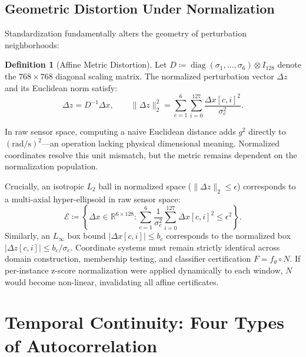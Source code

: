 \documentclass[11pt,a4paper]{article}
\newcommand{\R}{\mathbb R}
\theoremstyle{definition}
\newtheorem{definition}[proposition]{Definition}
\begin{document}
\subsection{Geometric Distortion Under Normalization}
Standardization fundamentally alters the geometry of perturbation neighborhoods:
\begin{definition}[Affine Metric Distortion]
Let $D \coloneqq \operatorname{diag}(\sigma_1, \ldots, \sigma_6) \otimes I_{128}$ denote the $768 \times 768$ diagonal scaling matrix. The normalized perturbation vector $\Delta z$ and its Euclidean norm satisfy:
\begin{equation}
\Delta z = D^{-1} \Delta x, \qquad \|\Delta z\|_2^2 = \sum_{c=1}^6 \sum_{i=0}^{127} \frac{\Delta x[c, i]^2}{\sigma_c^2}.
\end{equation}
\end{definition}

In raw sensor space, computing a naive Euclidean distance adds $g^2$ directly to $(\mathrm{rad/s})^2$---an operation lacking physical dimensional meaning. Normalized coordinates resolve this unit mismatch, but the metric remains dependent on the normalization population.

Crucially, an isotropic $L_2$ ball in normalized space ($\|\Delta z\|_2 \le \epsilon$) corresponds to a multi-axial hyper-ellipsoid in raw sensor space:
\begin{equation}
\mathcal{E} \coloneqq \left\{ \Delta x \in \R^{6 \times 128} : \sum_{c=1}^6 \frac{1}{\sigma_c^2} \sum_{i=0}^{127} \Delta x[c, i]^2 \le \epsilon^2 \right\}.
\end{equation}
Similarly, an $L_\infty$ box bound $|\Delta x[c, i]| \le b_c$ corresponds to the normalized box $|\Delta z[c, i]| \le b_c / \sigma_c$. Coordinate systems must remain strictly identical across domain construction, membership testing, and classifier certification $F = f_\theta \circ N$. If per-instance z-score normalization were applied dynamically to each window, $N$ would become non-linear, invalidating all affine certificates.

\section{Temporal Continuity: Four Types of Autocorrelation}
\end{document}
